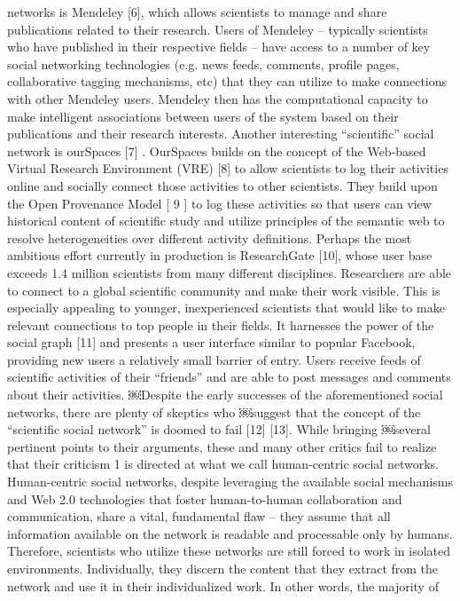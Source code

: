 networks is Mendeley [6], which allows scientists to manage and share publications related to their
research. Users of Mendeley -- typically scientists who have published in their respective fields -- have
access to a number of key social networking technologies (e.g. news feeds, comments, profile pages,
collaborative tagging mechanisms, etc) that they can utilize to make connections with other Mendeley
users. Mendeley then has the computational capacity to make intelligent associations between users of
the system based on their publications and their research interests. Another interesting “scientific” social
network is ourSpaces [7]
. OurSpaces builds on the concept of the Web-based Virtual Research
Environment (VRE) [8] to allow scientists to log their activities online and socially connect those
activities to other scientists. They build upon the Open Provenance Model [
9
] to log these activities so
that users can view historical content of scientific study and utilize principles of the semantic web to
resolve heterogeneities over different activity definitions. Perhaps the most ambitious effort currently in
production is ResearchGate [10], whose user base exceeds 1.4 million scientists from many different
disciplines. Researchers are able to connect to a global scientific community and make their work
visible. This is especially appealing to younger, inexperienced scientists that would like to make relevant
connections to top people in their fields. It harnesses the power of the social graph [11] and presents a
user interface similar to popular Facebook, providing new users a relatively small barrier of entry. Users
receive feeds of scientific activities of their “friends” and are able to post messages and comments about
their activities.
￼Despite the early successes of the aforementioned social networks, there are plenty of skeptics who
￼suggest that the concept of the “scientific social network” is doomed to fail [12] [13]. While bringing
￼several pertinent points to their arguments, these and many other critics fail to realize that their criticism
1
is directed at what we call human-centric social networks. Human-centric social networks, despite
leveraging the available social mechanisms and Web 2.0 technologies that foster human-to-human
collaboration and communication, share a vital, fundamental flaw -- they assume that all information
available on the network is readable and processable only by humans. Therefore, scientists who utilize
these networks are still forced to work in isolated environments. Individually, they discern the content
that they extract from the network and use it in their individualized work. In other words, the majority of
